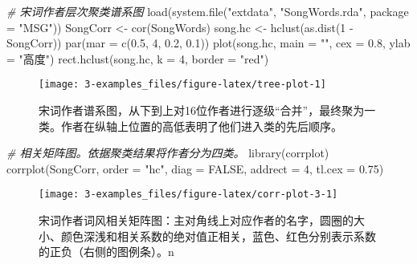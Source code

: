 \documentclass[
  lang=cn,
  11pt,
  scheme=chinese,
  chinesefont=nofont,
  citestyle=gb7714-2015,
  bibstyle=gb7714-2015]{elegantbook}
\newenvironment{Shaded}{\begin{snugshade}}{\end{snugshade}}
\newcommand{\AttributeTok}[1]{\textcolor[rgb]{0.77,0.63,0.00}{#1}}
\newcommand{\CommentTok}[1]{\textcolor[rgb]{0.56,0.35,0.01}{\textit{#1}}}
\newcommand{\ConstantTok}[1]{\textcolor[rgb]{0.00,0.00,0.00}{#1}}
\newcommand{\DecValTok}[1]{\textcolor[rgb]{0.00,0.00,0.81}{#1}}
\newcommand{\FloatTok}[1]{\textcolor[rgb]{0.00,0.00,0.81}{#1}}
\newcommand{\FunctionTok}[1]{\textcolor[rgb]{0.00,0.00,0.00}{#1}}
\newcommand{\NormalTok}[1]{#1}
\newcommand{\OtherTok}[1]{\textcolor[rgb]{0.56,0.35,0.01}{#1}}
\newcommand{\SpecialCharTok}[1]{\textcolor[rgb]{0.00,0.00,0.00}{#1}}
\newcommand{\StringTok}[1]{\textcolor[rgb]{0.31,0.60,0.02}{#1}}
\begin{document}
\begin{Shaded}
\begin{Highlighting}[]
\CommentTok{\# 宋词作者层次聚类谱系图}
\FunctionTok{load}\NormalTok{(}\FunctionTok{system.file}\NormalTok{(}\StringTok{"extdata"}\NormalTok{, }\StringTok{"SongWords.rda"}\NormalTok{, }\AttributeTok{package =} \StringTok{"MSG"}\NormalTok{))}
\NormalTok{SongCorr }\OtherTok{\textless{}{-}} \FunctionTok{cor}\NormalTok{(SongWords)}
\NormalTok{song.hc }\OtherTok{\textless{}{-}} \FunctionTok{hclust}\NormalTok{(}\FunctionTok{as.dist}\NormalTok{(}\DecValTok{1} \SpecialCharTok{{-}}\NormalTok{ SongCorr))}
\FunctionTok{par}\NormalTok{(}\AttributeTok{mar =} \FunctionTok{c}\NormalTok{(}\FloatTok{0.5}\NormalTok{, }\DecValTok{4}\NormalTok{, }\FloatTok{0.2}\NormalTok{, }\FloatTok{0.1}\NormalTok{))}
\FunctionTok{plot}\NormalTok{(song.hc, }\AttributeTok{main =} \StringTok{""}\NormalTok{, }\AttributeTok{cex =} \FloatTok{0.8}\NormalTok{, }\AttributeTok{ylab =} \StringTok{"高度"}\NormalTok{)}
\FunctionTok{rect.hclust}\NormalTok{(song.hc, }\AttributeTok{k =} \DecValTok{4}\NormalTok{, }\AttributeTok{border =} \StringTok{"red"}\NormalTok{)}
\end{Highlighting}
\end{Shaded}

\begin{figure}

{\centering \texttt{[image: 3-examples\_files/figure-latex/tree-plot-1]} 

}

\caption{宋词作者谱系图，从下到上对16位作者进行逐级``合并''，最终聚为一类。作者在纵轴上位置的高低表明了他们进入类的先后顺序。}\label{fig:tree-plot}
\end{figure}



\begin{Shaded}
\begin{Highlighting}[]
\CommentTok{\# 相关矩阵图。依据聚类结果将作者分为四类。}
\FunctionTok{library}\NormalTok{(corrplot)}
\FunctionTok{corrplot}\NormalTok{(SongCorr, }\AttributeTok{order =} \StringTok{"hc"}\NormalTok{, }\AttributeTok{diag =} \ConstantTok{FALSE}\NormalTok{, }\AttributeTok{addrect =} \DecValTok{4}\NormalTok{, }\AttributeTok{tl.cex =} \FloatTok{0.75}\NormalTok{)}
\end{Highlighting}
\end{Shaded}

\begin{figure}

{\centering \texttt{[image: 3-examples\_files/figure-latex/corr-plot-3-1]} 

}

\caption{宋词作者词风相关矩阵图：主对角线上对应作者的名字，圆圈的大小、颜色深浅和相关系数的绝对值正相关，蓝色、红色分别表示系数的正负（右侧的图例条）。n}\label{fig:corr-plot-3}
\end{figure}
\end{document}
